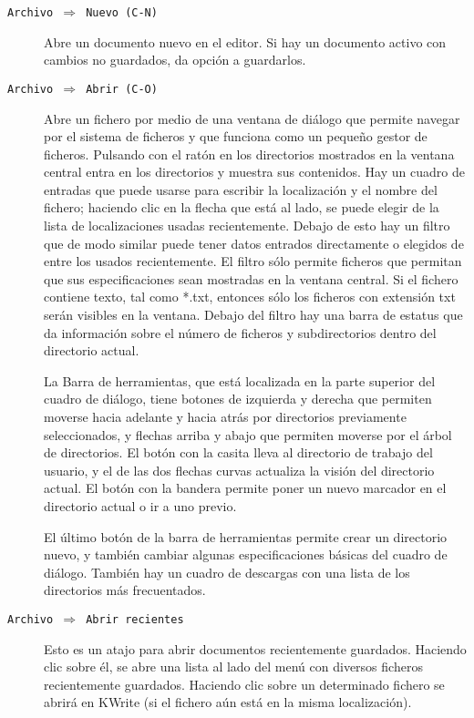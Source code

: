 \begin{description}

\item[{\tt Archivo $\Rightarrow$ Nuevo (C-N)}] Abre un documento nuevo
en el editor. Si hay un  documento activo con cambios no guardados, da
opción a guardarlos.

\item[{\tt  Archivo $\Rightarrow$  Abrir (C-O)}]  Abre un  fichero por
medio de una ventana de diálogo  que permite navegar por el sistema de
ficheros y que  funciona como un pequeño gestor  de ficheros. Pulsando
con el ratón en los directorios  mostrados en la ventana central entra
en los directorios y muestra sus contenidos. Hay un cuadro de entradas
que  puede  usarse para  escribir  la  localización  y el  nombre  del
fichero; haciendo clic en la flecha  que está al lado, se puede elegir
de la lista de localizaciones usadas recientemente. Debajo de esto hay
un filtro que de modo  similar puede tener datos entrados directamente
o elegidos de  entre los usados recientemente. El  filtro sólo permite
ficheros que  permitan que sus  especificaciones sean mostradas  en la
ventana  central.  Si  el  fichero contiene  texto,  tal  como  *.txt,
entonces  sólo los  ficheros con  extensión txt  serán visibles  en la
ventana. Debajo del filtro hay una barra de estatus que da información
sobre el  número de  ficheros y  subdirectorios dentro  del directorio
actual.

La Barra de herramientas, que está localizada en la parte superior del
cuadro de diálogo,  tiene botones de izquierda y  derecha que permiten
moverse  hacia  adelante y  hacia  atrás  por directorios  previamente
seleccionados, y  flechas arriba y  abajo que permiten moverse  por el
árbol de  directorios. El botón con  la casita lleva al  directorio de
trabajo  del usuario,  y el  de las  dos flechas  curvas actualiza  la
visión del directorio actual. El botón con la bandera permite poner un
nuevo marcador en el directorio actual o ir a uno previo.

El  último  botón  de  la  barra  de  herramientas  permite  crear  un
directorio nuevo,  y también cambiar algunas  especificaciones básicas
del cuadro  de diálogo.  También hay  un cuadro  de descargas  con una
lista de los directorios más frecuentados.

\item[{\tt Archivo  $\Rightarrow$ Abrir  recientes}] Esto es  un atajo
para abrir documentos recientemente guardados. Haciendo clic sobre él,
se abre una lista al lado del menú con diversos ficheros recientemente
guardados. Haciendo  clic sobre  un determinado  fichero se  abrirá en
{\sf KWrite} (si el fichero aún está en la misma localización).


\end{description}
